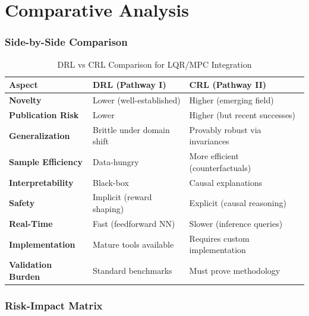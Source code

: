 \documentclass[11pt,a4paper]{article}
\begin{document}
\part*{Comparative Analysis}

\section{Side-by-Side Comparison}

\begin{table}[h]
\centering
\caption{DRL vs CRL Comparison for LQR/MPC Integration}
\footnotesize
\begin{tabular}{p{3cm}p{5cm}p{5cm}}
\toprule
\textbf{Aspect} & \textbf{DRL (Pathway I)} & \textbf{CRL (Pathway II)} \\
\midrule
\textbf{Novelty} & Lower (well-established) & Higher (emerging field) \\
\textbf{Publication Risk} & Lower & Higher (but recent successes) \\
\textbf{Generalization} & Brittle under domain shift & Provably robust via invariances \\
\textbf{Sample Efficiency} & Data-hungry & More efficient (counterfactuals) \\
\textbf{Interpretability} & Black-box & Causal explanations \\
\textbf{Safety} & Implicit (reward shaping) & Explicit (causal reasoning) \\
\textbf{Real-Time} & Fast (feedforward NN) & Slower (inference queries) \\
\textbf{Implementation} & Mature tools available & Requires custom implementation \\
\textbf{Validation Burden} & Standard benchmarks & Must prove methodology \\
\bottomrule
\end{tabular}
\end{table}

\section{Risk-Impact Matrix}
\end{document}

